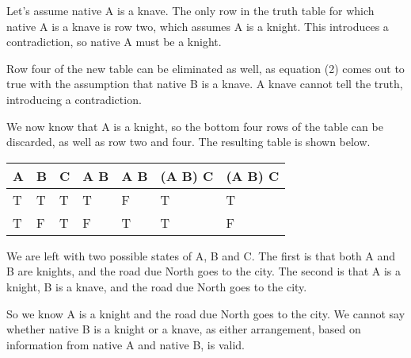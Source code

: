 \documentclass{article}
\begin{document}
Let's assume native A is a knave. The only row in the truth table for which native A is a knave is row two, which assumes A is a knight. This introduces a contradiction, so native A must be a knight.

Row four of the new table can be eliminated as well, as equation (2) comes out to true with the assumption that native B is a knave. A knave cannot tell the truth, introducing a contradiction. 

We now know that A is a knight, so the bottom four rows of the table can be discarded, as well as row two and four. The resulting table is shown below.

\begin{center}
	\begin{tabular}{ L L L | L | L | L | L }
		A & B & C & A \land B & A \veebar B & (A \land B) \rightarrow C & (A \land B) \rightarrow C \\
		\hline
		T & T & T & T & F & T & T \\ 
		T & F & T & F & T & T & F \\	
	\end{tabular}
\end{center}

We are left with two possible states of A, B and C. The first is that both A and B are knights, and the road due North goes to the city. The second is that A is a knight, B is a knave, and the road due North goes to the city.

So we know A is a knight and the road due North goes to the city. We cannot say whether native B is a knight or a knave, as either arrangement, based on information from native A and native B, is valid.
\end{document}
